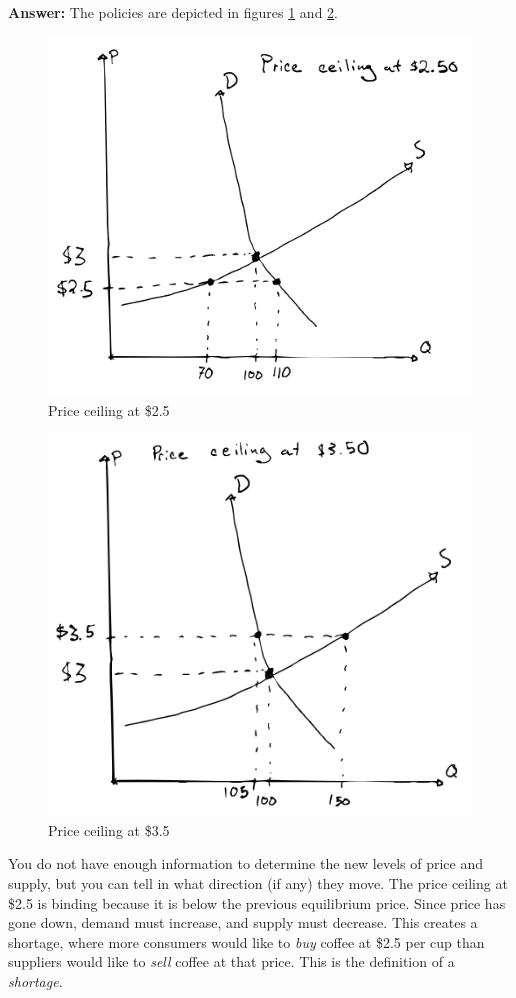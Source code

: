 \documentclass[12pt]{article}
\begin{document}
\textbf{Answer:}
The policies are depicted in figures \ref{fig:coffee_ceiling_250} and \ref{fig:coffee_ceiling_350}.

\begin{figure}
    \centering
    \includegraphics[width=.6\textwidth]{coffee_ceiling_250.png}
    \caption{Price ceiling at \$2.5}
    \label{fig:coffee_ceiling_250}
\end{figure}

\begin{figure}
    \centering
    \includegraphics[width=.6\textwidth]{coffee_ceiling_350.png}
    \caption{Price ceiling at \$3.5}
    \label{fig:coffee_ceiling_350}
\end{figure}


\vspace{2mm}

You do not have enough information to determine the new levels of price and supply, but you can tell in what direction (if any) they move. The price ceiling at \$2.5 is binding because it is below the previous equilibrium price. Since price has gone down, demand must increase, and supply must decrease. This creates a shortage, where more consumers would like to \textit{buy} coffee at \$2.5 per cup than suppliers would like to \textit{sell} coffee at that price. This is the definition of a \textit{shortage}.
\end{document}
